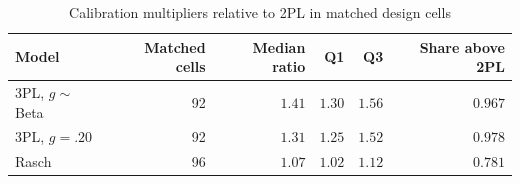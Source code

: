\begin{table}[htbp]\centering
\caption{Calibration multipliers relative to 2PL in matched design cells}\label{tab:c-inflation}
{\footnotesize\begin{tabular}{lrrrrr}
\toprule
Model & Matched cells & Median ratio & Q1 & Q3 & Share above 2PL \\
\midrule
3PL, $g \sim$ Beta & 92 & $1.41$ & $1.30$ & $1.56$ & $0.967$ \\
3PL, $g = .20$ & 92 & $1.31$ & $1.25$ & $1.52$ & $0.978$ \\
Rasch & 96 & $1.07$ & $1.02$ & $1.12$ & $0.781$ \\
\bottomrule
\end{tabular}}
\end{table}
